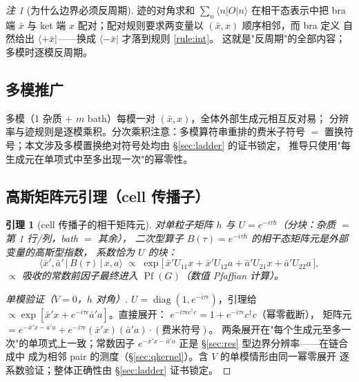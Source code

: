 \documentclass[11pt,a4paper]{ctexart}
\newcommand{\Pf}{\operatorname{Pf}}
\theoremstyle{plain}
\newtheorem{lemma}[identity]{引理}
\theoremstyle{definition}
\theoremstyle{remark}
\newtheorem{remark}[identity]{注}
\begin{document}
\begin{remark}[为什么边界必须反周期]
迹的对角求和 $\sum_n\langle n|O|n\rangle$ 在相干态表示中把 bra 端 $\bar x$
与 ket 端 $x$ 配对；配对规则要求两变量以 $(\bar x, x)$ 顺序相邻，而 bra 定义
自然给出 $\langle+\bar x|$——换成 $\langle-\bar x|$ 才落到规则 \ref{rule:int}。
这就是"反周期"的全部内容；多模时逐模反周期。
\end{remark}

\subsection{多模推广}\label{sec:multimode}

多模（1 杂质 $+$ $m$ bath）每模一对 $(\bar x, x)$，全体外部生成元相互反对易；
分辨率与迹规则是逐模乘积。分次乘积注意：多模算符串重排的费米子符号 $=$
置换符号；本文涉及多模置换绝对符号处均由 \S\ref{sec:ladder} 的证书锁定，
推导只使用"每生成元在单项式中至多出现一次"的幂零性。

\subsection{高斯矩阵元引理（cell 传播子）}

\begin{lemma}[cell 传播子的相干矩阵元]\label{lem:cell}
对单粒子矩阵 $h$ 与 $U = e^{-i\tau h}$（分块：杂质 $=$ 第 1 行/列，bath $=$ 其余），
二次型算子 $B(\tau) = e^{-i\tau h}$ 的相干态矩阵元是外部变量的高斯型指数，
系数恰为 $U$ 的块：
\begin{equation}
\langle\bar x', \bar a'\,|\,B(\tau)\,|\,x, a\rangle \;\propto\;
\exp\!\big[\,\bar x' U_{11} x + \bar x' U_{12} a + \bar a' U_{21} x + \bar a' U_{22} a\,\big],
\label{eq:celllemma}
\end{equation}
$\propto$ 吸收的常数前因子最终进入 $\Pf(G)$（数值 Pfaffian 计算）。
\end{lemma}

\begin{proof}[单模验证（$V = 0$，$h$ 对角）]
$U = \operatorname{diag}(1, e^{-i\tau\epsilon})$，引理给
$\propto\exp[\bar x' x + e^{-i\tau\epsilon}\bar a' a]$。直接展开：
$e^{-i\tau\epsilon c^\dagger c} = 1 + e^{-i\tau\epsilon}c^\dagger c$（幂零截断），
矩阵元 $= e^{-\bar x'x - \bar a'a} + e^{-i\tau\epsilon}(\bar x' x)(\bar a' a)\cdot(\text{费米符号})$。
两条展开在"每个生成元至多一次"的单项式上一致；常数因子
$e^{-\bar x'x - \bar a'a}$ 正是 \S\ref{sec:res} 型边界分辨率——在链合成中
成为相邻 pair 的测度（\S\ref{sec:qkernel}）。含 $V$ 的单模情形由同一幂零展开
逐系数验证；整体正确性由 \S\ref{sec:ladder} 证书锁定。
\end{proof}
\end{document}
